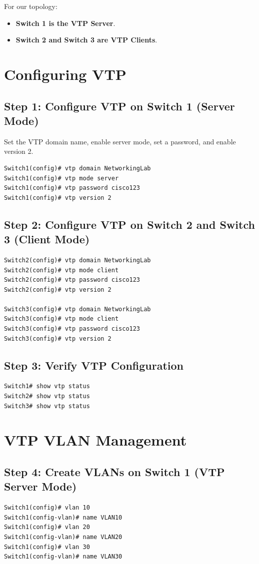 \documentclass[a4paper]{book}
\begin{document}
For our topology:
\begin{itemize}
    \item \textbf{Switch 1 is the VTP Server}.
    \item \textbf{Switch 2 and Switch 3 are VTP Clients}.
\end{itemize}

\section{Configuring VTP}
\subsection{Step 1: Configure VTP on Switch 1 (Server Mode)}
Set the VTP domain name, enable server mode, set a password, and enable version 2.
\begin{lstlisting}
Switch1(config)# vtp domain NetworkingLab
Switch1(config)# vtp mode server
Switch1(config)# vtp password cisco123
Switch1(config)# vtp version 2
\end{lstlisting}

\subsection{Step 2: Configure VTP on Switch 2 and Switch 3 (Client Mode)}
\begin{lstlisting}
Switch2(config)# vtp domain NetworkingLab
Switch2(config)# vtp mode client
Switch2(config)# vtp password cisco123
Switch2(config)# vtp version 2

Switch3(config)# vtp domain NetworkingLab
Switch3(config)# vtp mode client
Switch3(config)# vtp password cisco123
Switch3(config)# vtp version 2
\end{lstlisting}

\subsection{Step 3: Verify VTP Configuration}
\begin{lstlisting}
Switch1# show vtp status
Switch2# show vtp status
Switch3# show vtp status
\end{lstlisting}

\section{VTP VLAN Management}
\subsection{Step 4: Create VLANs on Switch 1 (VTP Server Mode)}
\begin{lstlisting}
Switch1(config)# vlan 10
Switch1(config-vlan)# name VLAN10
Switch1(config)# vlan 20
Switch1(config-vlan)# name VLAN20
Switch1(config)# vlan 30
Switch1(config-vlan)# name VLAN30
\end{lstlisting}
\end{document}
